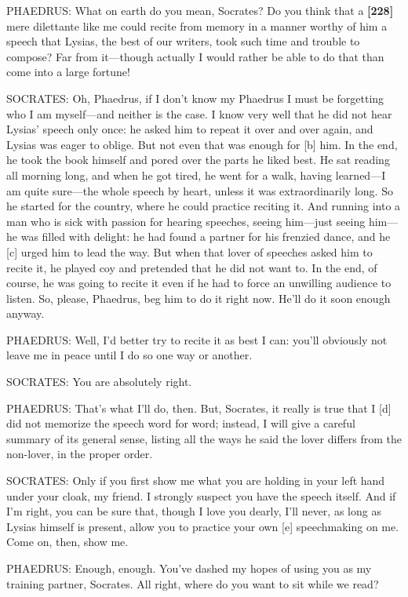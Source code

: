 PHAEDRUS: What on earth do you mean, Socrates? Do you think that a
{\bf {[}228{]}} mere dilettante like me could recite from memory in a
manner worthy of him a speech that Lysias, the best of our writers, took
such time and trouble to compose? Far from it---though actually I would
rather be able to do that than come into a large fortune!

SOCRATES: Oh, Phaedrus, if I don't know my Phaedrus I must be forgetting
who I am myself---and neither is the case. I know very well that he did
not hear Lysias' speech only once: he asked him to repeat it over and
over again, and Lysias was eager to oblige. But not even that was enough
for {[}b{]} him. In the end, he took the book himself and pored over the
parts he liked best. He sat reading all morning long, and when he got
tired, he went for a walk, having learned---I am quite sure---the whole
speech by heart, unless it was extraordinarily long. So he started for
the country, where he could practice reciting it. And running into a man
who is sick with passion for hearing speeches, seeing him---just seeing
him---he was filled with delight: he had found a partner for his
frenzied dance, and he {[}c{]} urged him to lead the way. But when that
lover of speeches asked him to recite it, he played coy and pretended
that he did not want to. In the end, of course, he was going to recite
it even if he had to force an unwilling audience to listen. So, please,
Phaedrus, beg him to do it right now. He'll do it soon enough anyway.

PHAEDRUS: Well, I'd better try to recite it as best I can: you'll
obviously not leave me in peace until I do so one way or another.

SOCRATES: You are absolutely right.

PHAEDRUS: That's what I'll do, then. But, Socrates, it really is true
that I {[}d{]} did not memorize the speech word for word; instead, I
will give a careful summary of its general sense, listing all the ways
he said the lover differs from the non-lover, in the proper order.

SOCRATES: Only if you first show me what you are holding in your left
hand under your cloak, my friend. I strongly suspect you have the speech
itself. And if I'm right, you can be sure that, though I love you
dearly, I'll never, as long as Lysias himself is present, allow you to
practice your own {[}e{]} speechmaking on me. Come on, then, show me.

PHAEDRUS: Enough, enough. You've dashed my hopes of using you as my
training partner, Socrates. All right, where do you want to sit while we
read?

